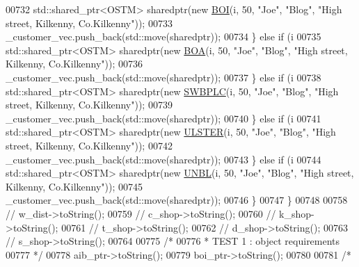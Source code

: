 \begin{DoxyCode}
00732             std::shared\_ptr<OSTM> sharedptr(\textcolor{keyword}{new} \hyperlink{class_b_o_i}{BOI}(i, 50, \textcolor{stringliteral}{"Joe"}, \textcolor{stringliteral}{"Blog"}, \textcolor{stringliteral}{"High street, Kilkenny,
       Co.Kilkenny"}));
00733             \_customer\_vec.push\_back(std::move(sharedptr));
00734         \} \textcolor{keywordflow}{else} \textcolor{keywordflow}{if} (i %
00735             std::shared\_ptr<OSTM> sharedptr(\textcolor{keyword}{new} \hyperlink{class_b_o_a}{BOA}(i, 50, \textcolor{stringliteral}{"Joe"}, \textcolor{stringliteral}{"Blog"}, \textcolor{stringliteral}{"High street, Kilkenny,
       Co.Kilkenny"}));
00736             \_customer\_vec.push\_back(std::move(sharedptr));
00737         \} \textcolor{keywordflow}{else} \textcolor{keywordflow}{if} (i %
00738             std::shared\_ptr<OSTM> sharedptr(\textcolor{keyword}{new} \hyperlink{class_s_w_b_p_l_c}{SWBPLC}(i, 50, \textcolor{stringliteral}{"Joe"}, \textcolor{stringliteral}{"Blog"}, \textcolor{stringliteral}{"High street, Kilkenny,
       Co.Kilkenny"}));
00739             \_customer\_vec.push\_back(std::move(sharedptr));
00740         \} \textcolor{keywordflow}{else} \textcolor{keywordflow}{if} (i %
00741             std::shared\_ptr<OSTM> sharedptr(\textcolor{keyword}{new} \hyperlink{class_u_l_s_t_e_r}{ULSTER}(i, 50, \textcolor{stringliteral}{"Joe"}, \textcolor{stringliteral}{"Blog"}, \textcolor{stringliteral}{"High street, Kilkenny,
       Co.Kilkenny"}));
00742             \_customer\_vec.push\_back(std::move(sharedptr));
00743         \} \textcolor{keywordflow}{else} \textcolor{keywordflow}{if} (i %
00744             std::shared\_ptr<OSTM> sharedptr(\textcolor{keyword}{new} \hyperlink{class_u_n_b_l}{UNBL}(i, 50, \textcolor{stringliteral}{"Joe"}, \textcolor{stringliteral}{"Blog"}, \textcolor{stringliteral}{"High street, Kilkenny,
       Co.Kilkenny"}));
00745             \_customer\_vec.push\_back(std::move(sharedptr));
00746         \}
00747     \}
00748 
00758     \textcolor{comment}{//    w\_dist->toString();}
00759     \textcolor{comment}{//    c\_shop->toString();}
00760     \textcolor{comment}{//    k\_shop->toString();}
00761     \textcolor{comment}{//    t\_shop->toString();}
00762     \textcolor{comment}{//    d\_shop->toString();}
00763     \textcolor{comment}{//    s\_shop->toString();}
00764 
00775     \textcolor{comment}{/*}
00776 \textcolor{comment}{     * TEST 1 : object requirements}
00777 \textcolor{comment}{     */}
00778     aib\_ptr->toString();
00779     boi\_ptr->toString();
00780 
00781     \textcolor{comment}{/*}

\end{DoxyCode}

